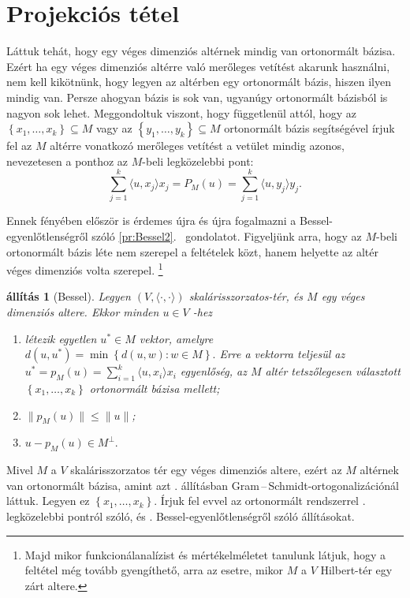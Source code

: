 \documentclass[a4paper, showtrims]{memoir}
\makeatletter
\renewenvironment{proof}[1][\proofname]
    {\par\pushQED{\qed}%
    \normalfont \topsep6\p@\@plus6\p@\relax
    \trivlist
    \item[\hskip\labelsep
        \itshape
    #1\@addpunct{:}]\ignorespaces}
    {\popQED\endtrivlist\@endpefalse}
\theoremstyle{plain}
\newtheorem{proposition}{állítás}[chapter]
\theoremstyle{remark}
\theoremstyle{definition}
\newcommand{\ip}[2]{\langle#1,#2\rangle}
\makeatother
\begin{document}
\section{Projekciós tétel}
Láttuk tehát, hogy egy véges dimenziós altérnek mindig van ortonormált bázisa.
Ezért ha egy véges dimenziós altérre való merőleges vetítést akarunk használni,
nem kell kikötnünk, hogy legyen az altérben egy ortonormált bázis, hiszen ilyen mindig van.
Persze ahogyan bázis is sok van, ugyanúgy ortonormált bázisból is nagyon sok lehet.
Meggondoltuk viszont, hogy függetlenül attól, hogy az $\left\{ x_1,\ldots,x_k \right\}\subseteq M$
vagy az $\left\{ y_1,\ldots,y_k \right\}\subseteq M$ ortonormált bázis segítségével írjuk fel az $M$
altérre vonatkozó merőleges vetítést a vetület mindig azonos, nevezetesen a ponthoz az $M$-beli legközelebbi pont:
\[
	\sum_{j=1}^{k}\ip{u}{x_j}x_j
	=
	P_M\left( u \right)
	=
	\sum_{j=1}^{k}\ip{u}{y_j}y_j.
\]

Ennek fényében először is érdemes újra és újra fogalmazni a Bessel-egyenlőtlenségről szóló \ref{pr:Bessel2}.~ gondolatot.
Figyeljünk arra, hogy az $M$-beli ortonormált bázis léte nem szerepel a feltételek közt,
hanem helyette az altér véges dimenziós volta szerepel.%
\footnote{Majd mikor funkcionálanalízist és mértékelméletet tanulunk látjuk, hogy a feltétel még tovább gyengíthető,
	arra az esetre, mikor $M$ a $V$ Hilbert-tér egy zárt altere.}
\begin{proposition}[Bessel]\label{pr:Bessel3}
	Legyen $\left( V,\ip{\cdot}{\cdot} \right)$ skalárisszorzatos-tér, és $M$ egy
	véges dimenziós altere.
	Ekkor minden $u\in V$ -hez
	\begin{enumerate}
		\item létezik egyetlen $u^\ast\in M$ vektor, amelyre
		      \(
		      d\left( u,u^\ast\right)
		      =
		      \min\left\{ d\left( u,w \right):w\in M \right\}.
		      \)
		      Erre a vektorra teljesül az $u^\ast=p_M\left( u \right)=\sum_{i=1}^k\ip{u}{x_i}x_i$ egyenlőség,
		      az $M$ altér tetszőlegesen választott  $\left\{ x_1,\ldots,x_k \right\}$ ortonormált bázisa mellett;
		\item
		      $\|p_M\left( u \right)\|\leq\|u\|$;
		\item
		      \(
		      u-p_M(u)\in M^\perp.
		      \)
		      \qedhere
	\end{enumerate}
\end{proposition}
\begin{proof}
	Mivel $M$ a $V$ skalárisszorzatos tér egy véges dimenziós altere,
	ezért az $M$ altérnek van
    ortonormált bázisa, amint azt . állításban Gram\,--\,Schmidt-ortogonalizációnál láttuk.
	Legyen ez $\left\{ x_1,\ldots,x_k \right\}$.
    Írjuk fel evvel az ortonormált rendszerrel . legközelebbi pontról szóló,
    és . Bessel-egyen\-lőt\-lenség\-ről szóló állításokat.
\end{proof}
\end{document}
